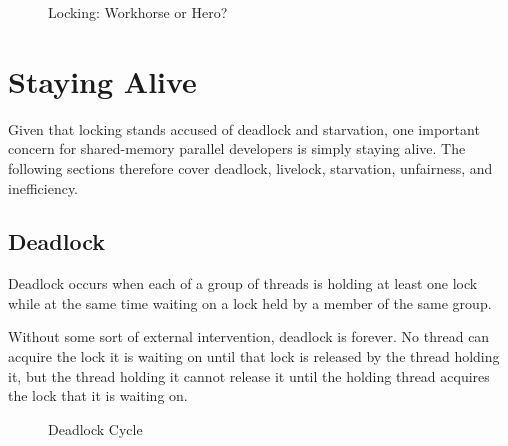 \begin{figure}[tb]
\begin{center}
\end{center}
\caption{Locking: Workhorse or Hero?}
\label{fig:locking:Locking: Workhorse or Hero?}
\end{figure}

\section{Staying Alive}
\label{sec:locking:Staying Alive}

Given that locking stands accused of deadlock and starvation,
one important concern for shared-memory parallel developers is
simply staying alive.
The following sections therefore cover deadlock, livelock, starvation,
unfairness, and inefficiency.

\subsection{Deadlock}
\label{sec:locking:Deadlock}

Deadlock occurs when each of a group of threads is holding at least one
lock while at the same time waiting on a lock held by a member
of the same group.

Without some sort of external intervention, deadlock is forever.
No thread can acquire the lock it is waiting on until that
lock is released by the thread holding it, but the thread holding
it cannot release it until the holding thread acquires the lock that
it is waiting on.

\begin{figure}[tb]
\begin{center}
\end{center}
\caption{Deadlock Cycle}
\label{fig:locking:Deadlock Cycle}
\end{figure}

